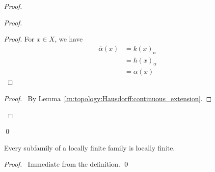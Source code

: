 \begin{proof}
\begin{proof}
  \begin{proof}
    \pf For $x \in X$, we have
    \begin{align*}
      \overline{\alpha}(x) & = k(x)_\alpha \\
      & = h(x)_\alpha \\
      & = \alpha(x)
    \end{align*}
  \end{proof}
  \begin{proof}
    \pf\ By Lemma \ref{lm:topology:Hausdorff:continuous_extension}.
  \end{proof}
\end{proof}
\qed
\end{proof}

\begin{lm}
\label{lm:topology:locally_finite:subfamily}
Every subfamily of a locally finite family is locally finite.
\end{lm}

\begin{proof}
\pf\ Immediate from the definition. \qed
\end{proof}
